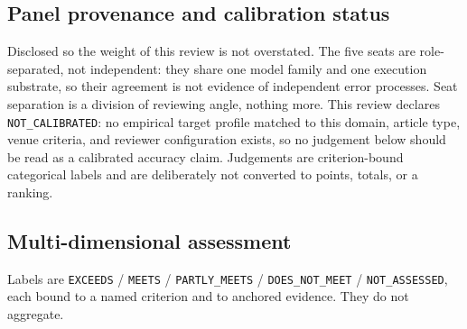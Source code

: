 \documentclass[11pt,a4paper]{article}
\begin{document}
\subsection*{Panel provenance and calibration status}

Disclosed so the weight of this review is not overstated. The five seats are
role-separated, not independent: they share one model family and one execution
substrate, so their agreement is not evidence of independent error processes.
Seat separation is a division of reviewing angle, nothing more. This review
declares \texttt{NOT\_CALIBRATED}: no empirical target profile matched to this
domain, article type, venue criteria, and reviewer configuration exists, so no
judgement below should be read as a calibrated accuracy claim. Judgements are
criterion-bound categorical labels and are deliberately not converted to
points, totals, or a ranking.

\subsection*{Multi-dimensional assessment}

Labels are \texttt{EXCEEDS} / \texttt{MEETS} / \texttt{PARTLY\_MEETS} /
\texttt{DOES\_NOT\_MEET} / \texttt{NOT\_ASSESSED}, each bound to a named
criterion and to anchored evidence. They do not aggregate.
\end{document}
